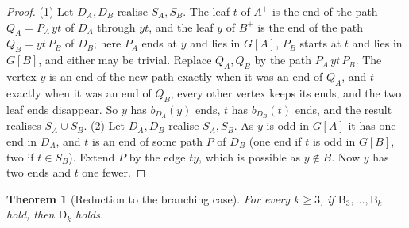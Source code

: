 \documentclass[11pt]{amsart}
\newtheorem{theorem}{Theorem}
\theoremstyle{definition}
\begin{document}
\begin{proof}
(1) Let $D_A,D_B$ realise $S_A,S_B$. The leaf $t$ of $A^+$ is the end of the path $Q_A=P_A\,yt$ of
$D_A$ through $yt$, and the leaf $y$ of $B^+$ is the end of the path $Q_B=yt\,P_B$ of $D_B$; here
$P_A$ ends at $y$ and lies in $G[A]$, $P_B$ starts at $t$ and lies in $G[B]$, and either may be
trivial. Replace $Q_A,Q_B$ by the path $P_A\,yt\,P_B$. The vertex $y$ is an end of the new path
exactly when it was an end of $Q_A$, and $t$ exactly when it was an end of $Q_B$; every other vertex
keeps its ends, and the two leaf ends disappear. So $y$ has $b_{D_A}(y)$ ends, $t$ has $b_{D_B}(t)$
ends, and the result realises $S_A\cup S_B$.
(2) Let $D_A,D_B$ realise $S_A,S_B$. As $y$ is odd in $G[A]$ it has one end in $D_A$, and $t$ is an
end of some path $P$ of $D_B$ (one end if $t$ is odd in $G[B]$, two if $t\in S_B$). Extend $P$ by
the edge $ty$, which is possible as $y\notin B$. Now $y$ has two ends and $t$ one fewer.
\end{proof}

\begin{theorem}[Reduction to the branching case]\label{thm:branching}
For every $k\ge3$, if $\mathrm{B}_3,\dots,\mathrm{B}_k$ hold, then $\mathrm{D}_k$ holds.
\end{theorem}
\end{document}
